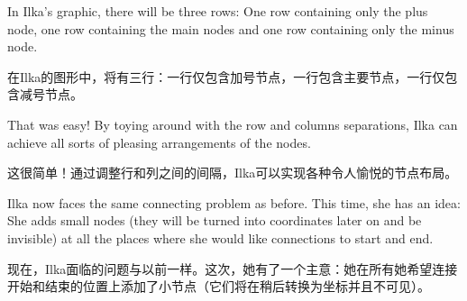 In Ilka's graphic, there will be three rows: One row containing only the plus
node, one row containing the main nodes and one row containing only the minus
node.

在Ilka的图形中，将有三行：一行仅包含加号节点，一行包含主要节点，一行仅包含减号节点。






\begin{codeexample}[preamble={\usetikzlibrary{shapes.misc}}]
\end{codeexample}
%
That was easy! By toying around with the row and columns separations, Ilka can
achieve all sorts of pleasing arrangements of the nodes.

这很简单！通过调整行和列之间的间隔，Ilka可以实现各种令人愉悦的节点布局。

Ilka now faces the same connecting problem as before. This time, she has an
idea: She adds small nodes (they will be turned into coordinates later on and
be invisible) at all the places where she would like connections to start and
end.

现在，Ilka面临的问题与以前一样。这次，她有了一个主意：她在所有她希望连接开始和结束的位置上添加了小节点（它们将在稍后转换为坐标并且不可见）。


